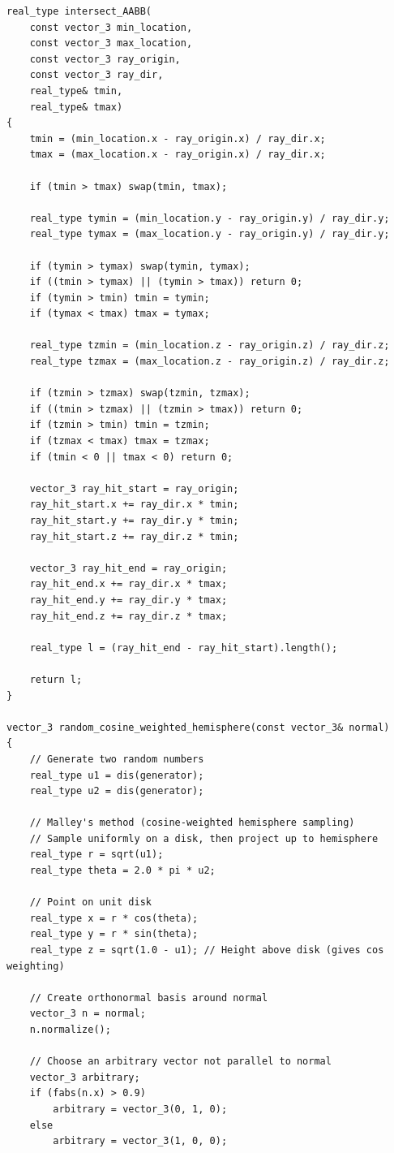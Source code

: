\documentclass[12pt]{article}
\begin{document}
\begin{lstlisting}
real_type intersect_AABB(
	const vector_3 min_location, 
	const vector_3 max_location, 
	const vector_3 ray_origin, 
	const vector_3 ray_dir, 
	real_type& tmin, 
	real_type& tmax)
{
	tmin = (min_location.x - ray_origin.x) / ray_dir.x;
	tmax = (max_location.x - ray_origin.x) / ray_dir.x;

	if (tmin > tmax) swap(tmin, tmax);

	real_type tymin = (min_location.y - ray_origin.y) / ray_dir.y;
	real_type tymax = (max_location.y - ray_origin.y) / ray_dir.y;

	if (tymin > tymax) swap(tymin, tymax);
	if ((tmin > tymax) || (tymin > tmax)) return 0;
	if (tymin > tmin) tmin = tymin;
	if (tymax < tmax) tmax = tymax;

	real_type tzmin = (min_location.z - ray_origin.z) / ray_dir.z;
	real_type tzmax = (max_location.z - ray_origin.z) / ray_dir.z;

	if (tzmin > tzmax) swap(tzmin, tzmax);
	if ((tmin > tzmax) || (tzmin > tmax)) return 0;
	if (tzmin > tmin) tmin = tzmin;
	if (tzmax < tmax) tmax = tzmax;
	if (tmin < 0 || tmax < 0) return 0;

	vector_3 ray_hit_start = ray_origin;
	ray_hit_start.x += ray_dir.x * tmin;
	ray_hit_start.y += ray_dir.y * tmin;
	ray_hit_start.z += ray_dir.z * tmin;

	vector_3 ray_hit_end = ray_origin;
	ray_hit_end.x += ray_dir.x * tmax;
	ray_hit_end.y += ray_dir.y * tmax;
	ray_hit_end.z += ray_dir.z * tmax;

	real_type l = (ray_hit_end - ray_hit_start).length();

	return l;
}

vector_3 random_cosine_weighted_hemisphere(const vector_3& normal)
{
	// Generate two random numbers
	real_type u1 = dis(generator);
	real_type u2 = dis(generator);

	// Malley's method (cosine-weighted hemisphere sampling)
	// Sample uniformly on a disk, then project up to hemisphere
	real_type r = sqrt(u1);
	real_type theta = 2.0 * pi * u2;

	// Point on unit disk
	real_type x = r * cos(theta);
	real_type y = r * sin(theta);
	real_type z = sqrt(1.0 - u1); // Height above disk (gives cos weighting)

	// Create orthonormal basis around normal
	vector_3 n = normal;
	n.normalize();

	// Choose an arbitrary vector not parallel to normal
	vector_3 arbitrary;
	if (fabs(n.x) > 0.9)
		arbitrary = vector_3(0, 1, 0);
	else
		arbitrary = vector_3(1, 0, 0);


\end{lstlisting}
\end{document}
